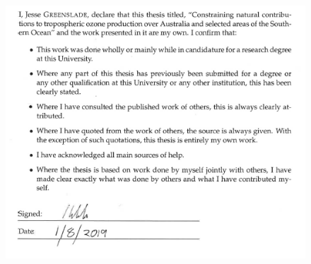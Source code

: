 
\begin{declaration}
  \addchaptertocentry{\authorshipname} %
  
  \begin{figure}
    \includegraphics{Figures/Declaration_Cropped.png}
  \end{figure}
  
%  
%  
%  
\end{declaration}

